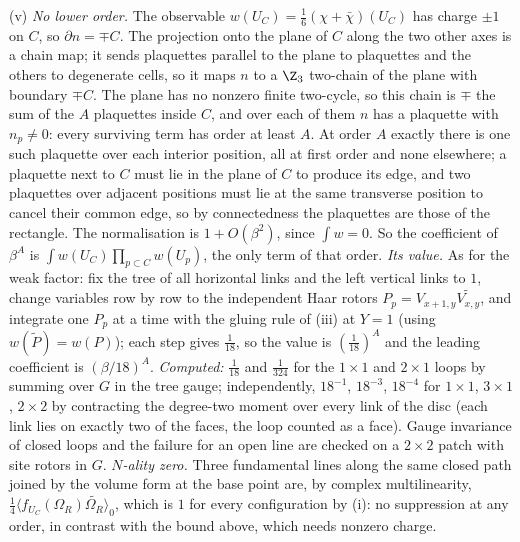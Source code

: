 (v) \emph{No lower order.} The observable $w(U_C) = \tfrac16(\chi + \bar\chi)(U_C)$ has charge $\pm1$ on $C$, so $\partial n = \mp C$. The projection onto the plane of $C$ along the two other axes is a chain map; it sends plaquettes parallel to the plane to plaquettes and the others to degenerate cells, so it maps $n$ to a $\Z_3$ two-chain of the plane with boundary $\mp C$. The plane has no nonzero finite two-cycle, so this chain is $\mp$ the sum of the $A$ plaquettes inside $C$, and over each of them $n$ has a plaquette with $n_p \ne 0$: every surviving term has order at least $A$. At order $A$ exactly there is one such plaquette over each interior position, all at first order and none elsewhere; a plaquette next to $C$ must lie in the plane of $C$ to produce its edge, and two plaquettes over adjacent positions must lie at the same transverse position to cancel their common edge, so by connectedness the plaquettes are those of the rectangle. The normalisation is $1 + O(\beta^2)$, since $\int w = 0$. So the coefficient of $\beta^{A}$ is $\int w(U_C)\prod_{p \subset C}w(U_p)$, the only term of that order. \emph{Its value.} As for the weak factor: fix the tree of all horizontal links and the left vertical links to $1$, change variables row by row to the independent Haar rotors $P_p = V_{x+1,y}\widetilde{V_{x,y}}$, and integrate one $P_p$ at a time with the gluing rule of (iii) at $Y = 1$ (using $w(\widetilde{P}) = w(P)$); each step gives $\tfrac1{18}$, so the value is $(\tfrac1{18})^{A}$ and the leading coefficient is $(\beta/18)^{A}$. \emph{Computed:} $\tfrac1{18}$ and $\tfrac1{324}$ for the $1 \times 1$ and $2 \times 1$ loops by summing over $G$ in the tree gauge; independently, $18^{-1}$, $18^{-3}$, $18^{-4}$ for $1 \times 1$, $3 \times 1$, $2 \times 2$ by contracting the degree-two moment over every link of the disc (each link lies on exactly two of the faces, the loop counted as a face). Gauge invariance of closed loops and the failure for an open line are checked on a $2 \times 2$ patch with site rotors in $G$. \emph{$N$-ality zero.} Three fundamental lines along the same closed path joined by the volume form at the base point are, by complex multilinearity, $\tfrac14\langle f_{U_C}(\Omega_R)\widetilde{\Omega_R}\rangle_0$, which is $1$ for every configuration by (i): no suppression at any order, in contrast with the bound above, which needs nonzero charge.

